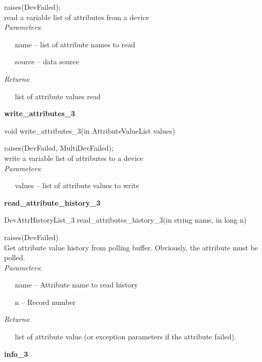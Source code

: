 raises(DevFailed);\\

read a variable list of attributes from a device\\

\emph{Parameters}:

~~~name – list of attribute names to read

~~~source – data source

\emph{Returns}:

~~~list of attribute values read \textbf{}\\

\begin{flushleft}
\textbf{write\_attributes\_3}
\par\end{flushleft}

void write\_attributes\_3(in AttributeValueList values)

raises(DevFailed, MultiDevFailed);\\

write a variable list of attributes to a device\\

\emph{Parameters}:

~~~values – list of attribute values to write\\

\begin{flushleft}
\textbf{read\_attribute\_history\_3}
\par\end{flushleft}

DevAttrHistoryList\_3 read\_attributes\_history\_3(in string name,
in long n)

raises(DevFailed)\\

Get attribute value history from polling buffer. Obviously, the attribute
must be polled.\\

\emph{Parameters}:

~~~name – Attribute name to read history

~~~n – Record number

\emph{Returns}:

~~~list of attribute value (or exception parameters if the attribute
failed).\\

\begin{flushleft}
\textbf{info\_3}
\par\end{flushleft}

